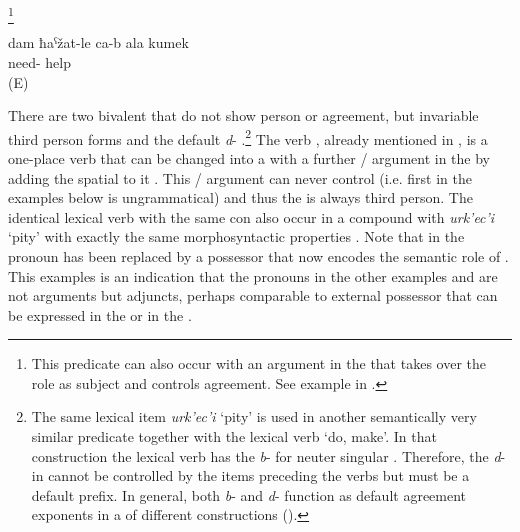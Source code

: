 \begin{exe}
	\ex	\label{ex:copula constructions with absolutive stimulus}
	\begin{xlist}
		\ex	{} \footnote{This predicate can also occur with an  argument in the  that takes over the role as  subject and controls agreement. See example  in .}
		\ex	{} 
	\end{xlist}
	
	
	\ex	\label{ex:I need your help.AFF}
	\gll	dam	ħaˁžat-le	ca-b	ala	kumek\\
			need-			help\\
	\glt	{} (E)
\end{exe}


There are two bivalent  that do not show person or  agreement, but invariable third person forms and the default   \textit{d}- .\footnote{The same lexical item \textit{urk'ec'i} `pity' is used in another semantically very similar predicate together with the lexical verb `do, make'. In that construction the lexical verb has the  \textit{b}- for neuter singular . Therefore, the  \textit{d}- in  cannot be controlled by the items preceding the verbs but must be a default prefix. In general, both \textit{b}- and \textit{d}- function as default agreement exponents in a  of different constructions ().} The verb  , already mentioned in , is a one-place verb that can be changed into a  with a further / argument in the  by adding the spatial   to it . This / argument can never control  (i.e. first  in the examples below is ungrammatical) and thus the  is always third person. The identical lexical verb with the same  con also occur in a compound with \textit{urk'ec'i} `pity' with exactly the same morphosyntactic properties . Note that in  the  pronoun has been replaced by a  possessor that now encodes the semantic role of . This examples is an indication that the  pronouns in the other examples  and  are not arguments but adjuncts, perhaps comparable to external possessor that can be expressed in the  or in the . 
%


